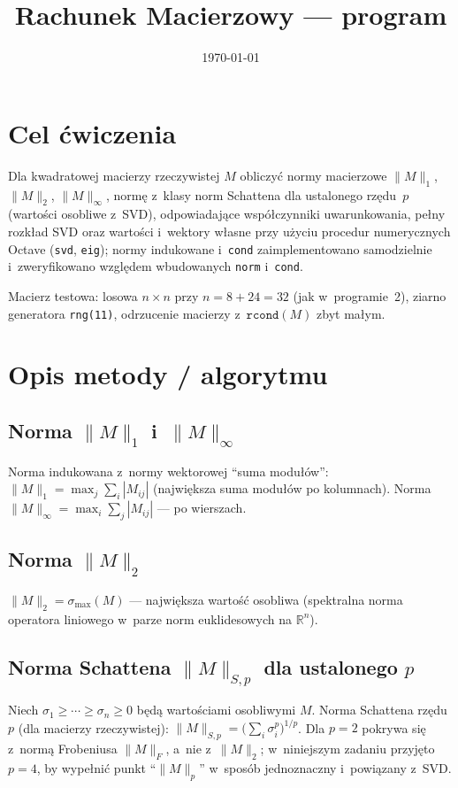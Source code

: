 \documentclass[polish]{template/projectreport}
\title{\TytulZadania\\{\large Rachunek Macierzowy --- program \NumerProgramu}}
\author{\Autorzy}
\date{\today}
\begin{document}


\maketitle

\section{Cel ćwiczenia}
Dla kwadratowej macierzy rzeczywistej $M$ obliczyć normy macierzowe $\|M\|_1$, $\|M\|_2$, $\|M\|_\infty$, normę z~klasy norm Schattena dla ustalonego rzędu~$p$ (wartości osobliwe z~SVD), odpowiadające współczynniki uwarunkowania, pełny rozkład SVD oraz wartości i~wektory własne przy użyciu procedur numerycznych Octave (\texttt{svd}, \texttt{eig}); normy indukowane i~\texttt{cond} zaimplementowano samodzielnie i~zweryfikowano względem wbudowanych \texttt{norm} i~\texttt{cond}.

Macierz testowa: losowa $n\times n$ przy $n = 8 + 24 = 32$ (jak w~programie~2), ziarno generatora \texttt{rng(11)}, odrzucenie macierzy z~$\texttt{rcond}(M)$ zbyt małym.

\section{Opis metody / algorytmu}

\subsection{Norma $\|M\|_1$ i~$\|M\|_\infty$}
Norma indukowana z~normy wektorowej ``suma modułów'': $\|M\|_1 = \max_j \sum_i |M_{ij}|$ (największa suma modułów po kolumnach). Norma $\|M\|_\infty = \max_i \sum_j |M_{ij}|$ --- po wierszach.

\subsection{Norma $\|M\|_2$}
$\|M\|_2 = \sigma_{\max}(M)$ --- największa wartość osobliwa (spektralna norma operatora liniowego w~parze norm euklidesowych na $\mathbb{R}^n$).

\subsection{Norma Schattena $\|M\|_{S,p}$ dla ustalonego $p$}
Niech $\sigma_1 \ge \cdots \ge \sigma_n \ge 0$ będą wartościami osobliwymi $M$. Norma Schattena rzędu~$p$ (dla macierzy rzeczywistej): $\|M\|_{S,p} = \bigl(\sum_i \sigma_i^p\bigr)^{1/p}$. Dla $p=2$ pokrywa się z~normą Frobeniusa $\|M\|_F$, a~nie z~$\|M\|_2$; w~niniejszym zadaniu przyjęto $p=4$, by wypełnić punkt ``$\|M\|_p$'' w~sposób jednoznaczny i~powiązany z~SVD.
\end{document}
